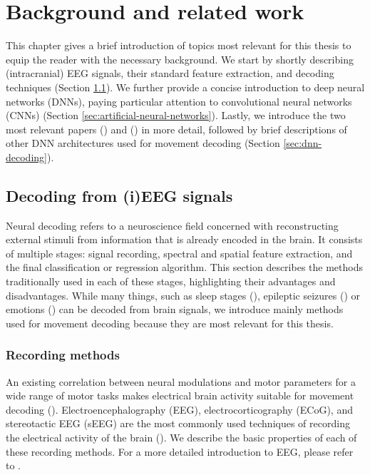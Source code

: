 \chapter{Background and related work}
\label{chap:background}
This chapter gives a brief introduction of topics most relevant for this thesis to equip the reader with the necessary background.
We start by shortly describing (intracranial) EEG signals, their standard feature extraction, and decoding techniques (Section \ref{sec:decoding-from-ieeg}). We further provide a concise introduction to deep neural networks (DNNs), paying particular attention to convolutional neural networks (CNNs) (Section \ref{sec:artificial-neural-networks}).
Lastly, we introduce the two most relevant papers (\cite{Hammer-2021}) and (\cite{schirrmeister-deep-2017}) in more detail, followed by brief descriptions of other DNN architectures used for movement decoding (Section \ref{sec:dnn-decoding}).

\section{Decoding from (i)EEG signals}
\label{sec:decoding-from-ieeg}
Neural decoding refers to a neuroscience field concerned with reconstructing external stimuli from information that is already encoded in the brain. 
It consists of multiple stages: signal recording, spectral and spatial feature extraction, and the final classification or regression algorithm. 
This section describes the methods traditionally used in each of these stages, highlighting their advantages and disadvantages. 
While many things, such as sleep stages (\cite{sleep-eegnet}), epileptic seizures (\cite{epileptic-seizures-eeg}) or emotions (\cite{emotion-eeg}) can be decoded from brain signals, we introduce mainly methods used for movement decoding because they are most relevant for this thesis. 

\subsection{Recording methods}
An existing correlation between neural modulations and motor parameters for a wide range of motor tasks makes electrical brain activity suitable for movement decoding  (\cite{lebedev-cortical-2005}).
Electroencephalography (EEG), electrocorticography (ECoG), and stereotactic EEG (sEEG) are the most commonly used techniques of recording the electrical activity of the brain (\cite{tam-human-2019}).
We describe the basic properties of each of these recording methods. For a more detailed introduction to EEG, please refer to \cite{NiedermeyersElectroencephalography}.


